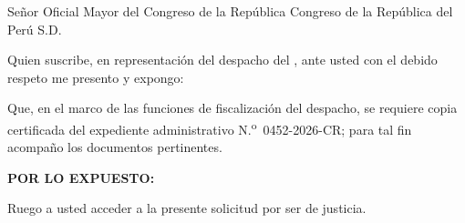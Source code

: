 \documentclass{solicitud}
\begin{document}

\destinatariosolicitud
  {Señor Oficial Mayor del Congreso de la República}
  {Congreso de la República del Perú}
  {S.D.}

Quien suscribe, en representación del despacho del 
, ante usted con el debido respeto me presento y
expongo:

Que, en el marco de las funciones de fiscalización del despacho, se
requiere copia certificada del expediente administrativo
N.\textsuperscript{o}~0452-2026-CR; para tal fin acompaño los documentos
pertinentes.

\textbf{POR LO EXPUESTO:}

Ruego a usted acceder a la presente solicitud por ser de justicia.

\vfill
\lugaryfecha
\bloquefirma[2.0cm]
\end{document}
